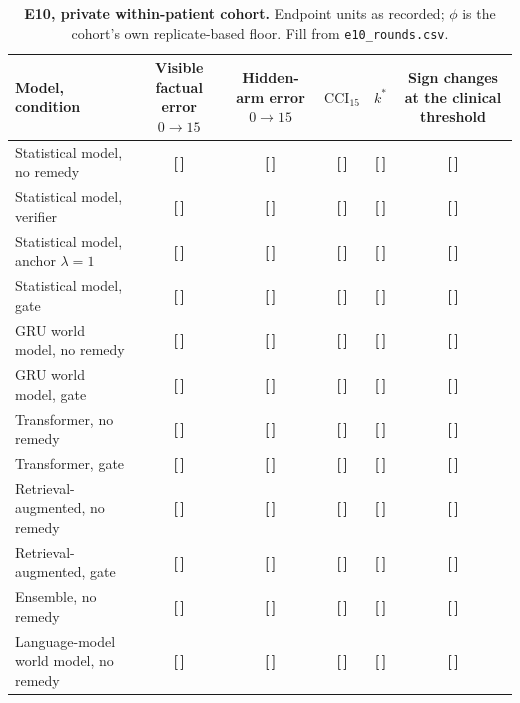 \documentclass[11pt,a4paper]{article}
\newcommand{\T}{{\color{red}\textbf{[\,]}}}
\newcommand{\CCI}{\mathrm{CCI}}
\begin{document}
\begin{table}[!htbp]\centering\footnotesize
\caption{\textbf{E10, private within-patient cohort.} Endpoint units as recorded; $\phi$ is the cohort's own replicate-based floor. Fill from \texttt{e10\_rounds.csv}.}
\label{tab:s34}
\begin{tabularx}{\textwidth}{@{}p{3.9cm} C C C C C@{}}\toprule
Model, condition & Visible factual error $0\to15$ & Hidden-arm error $0\to15$ & $\CCI_{15}$ & $k^*$ & Sign changes at the clinical threshold\\\midrule
Statistical model, no remedy & \T & \T & \T & \T & \T\\
Statistical model, verifier & \T & \T & \T & \T & \T\\
Statistical model, anchor $\lambda=1$ & \T & \T & \T & \T & \T\\
Statistical model, gate & \T & \T & \T & \T & \T\\
GRU world model, no remedy & \T & \T & \T & \T & \T\\
GRU world model, gate & \T & \T & \T & \T & \T\\
Transformer, no remedy & \T & \T & \T & \T & \T\\
Transformer, gate & \T & \T & \T & \T & \T\\
Retrieval-augmented, no remedy & \T & \T & \T & \T & \T\\
Retrieval-augmented, gate & \T & \T & \T & \T & \T\\
Ensemble, no remedy & \T & \T & \T & \T & \T\\
Language-model world model, no remedy & \T & \T & \T & \T & \T\\
\bottomrule\end{tabularx}
\end{table}
\FloatBarrier
\end{document}
